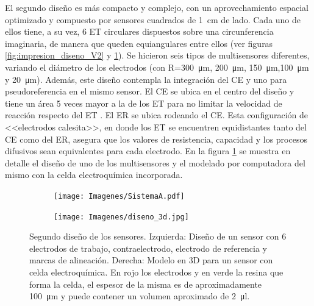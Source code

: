 		 	 El segundo diseño es más compacto y complejo, con un aprovechamiento espacial optimizado y compuesto por sensores cuadrados de \SI{1}{\cm} de lado. Cada uno de ellos tiene, a su vez, 6 ET circulares dispuestos sobre una circunferencia imaginaria, de manera que queden equiangulares entre ellos (ver figuras \ref{fig:impresion_diseno_V2} y \ref{fig:mascara_diseno_v2}). Se hicieron seis tipos de multisensores diferentes, variando el diámetro de los electrodos (con R=\SI{300}{\um}, \SI{200}{\um}, \SI{150}{\um},\SI{100}{\um} y \SI{20}{\um}). Además, este diseño contempla la integración del CE y uno para pseudoreferencia en el mismo sensor. El CE se ubica en el centro del diseño y tiene un área 5 veces mayor a la de los ET para no limitar la velocidad de reacción respecto del ET \cite{Wi2000}. El ER se ubica rodeando el CE. Esta configuración de <<electrodos calesita>>, en donde los ET se encuentren equidistantes tanto del CE como del ER, asegura que los valores de resistencia, capacidad y los procesos difusivos sean equivalentes para cada electrodo.\cite{Bockris1974}  En la figura \ref{fig:mascara_diseno_v2} se muestra en detalle el diseño de uno de los multisensores y el modelado por computadora del mismo con la celda electroquímica incorporada. 

		    	    \begin{figure}[t!]
			 	    \begin{subfigure}[t]{0.395\textwidth}
			       	\texttt{[image: Imagenes/SistemaA.pdf]}
			    	\end{subfigure}
					\begin{subfigure}[t]{0.595\textwidth}
			        \texttt{[image: Imagenes/diseno\_3d.jpg]}
			        \end{subfigure}
			     	\caption[Segundo diseño y máscara de los sensores]{Segundo diseño de los sensores. Izquierda: Diseño de un sensor con 6 electrodos de trabajo, contraelectrodo, electrodo de referencia y marcas de alineación. Derecha: Modelo en 3D para un sensor con celda electroquímica. En rojo los electrodos y en verde la resina que forma la celda, el espesor de la misma es de aproximadamente \SI{100}{\um} y puede contener un volumen aproximado de \SI{2}{\ul}.}
			     	\label{fig:mascara_diseno_v2}
			     	\end{figure}
			 
